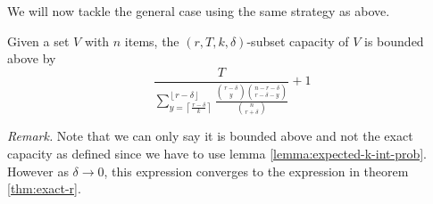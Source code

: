 We will now tackle the general case using the same strategy as above. 

\begin{theorem}
    Given a set $V$ with $n$ items, the $(r,T,k,\delta)$-subset capacity of $V$ is bounded above by
    \begin{equation*}
     \frac{T}{\sum_{y = \left\lceil \frac{r-\delta}{k} \right\rceil}^{\left\lfloor r - \delta \right\rfloor} \frac{\binom{r-\delta}{y} \binom{n-r-\delta}{r-\delta-y}}{\binom{n}{r+\delta}}} + 1
    \end{equation*}
\end{theorem}

\textit{Remark.} Note that we can only say it is bounded above and not the exact capacity as defined since we have to use lemma \ref{lemma:expected-k-int-prob}. However as $\delta \to 0$, this expression converges to the expression in theorem \ref{thm:exact-r}. 

